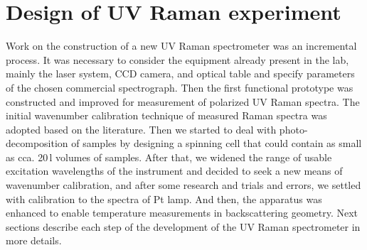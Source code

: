 \section{Design of UV Raman experiment}

Work on the construction of a new UV Raman spectrometer was an incremental
process.
It was necessary to consider the equipment already present in the lab, mainly
the laser system, CCD camera, and optical table and specify parameters of the
chosen commercial spectrograph.
Then the first functional prototype was constructed and improved for
measurement of polarized UV Raman spectra.
The initial wavenumber calibration technique of measured Raman spectra
was adopted based on the literature.
Then we started to deal with photo-decomposition of samples by designing a
spinning cell that could contain as small as cca. 20\,l volumes of
samples.
After that, we widened the range of usable excitation wavelengths of the
instrument and decided to seek a new means of wavenumber calibration, and
after some research and trials and errors, we settled with calibration to the
spectra of Pt lamp.
And then, the apparatus was enhanced to enable temperature measurements in
backscattering geometry.
Next sections describe each step of the development of the UV Raman
spectrometer in more details.












